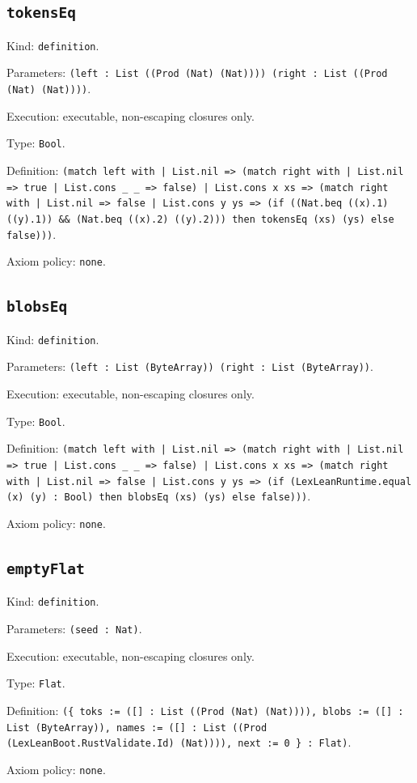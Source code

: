 \documentclass[11pt]{article}
\begin{document}
\subsection*{\texttt{tokensEq}}
\noindent Kind: \texttt{definition}.\par
\noindent Parameters: \texttt{(left : List ((Prod (Nat) (Nat)))) (right : List ((Prod (Nat) (Nat))))}.\par
\noindent Execution: executable, non-escaping closures only.\par
\noindent Type: \texttt{Bool}.\par
\noindent Definition: \texttt{(match left with | List.nil => (match right with | List.nil => true | List.cons \_ \_ => false) | List.cons x xs => (match right with | List.nil => false | List.cons y ys => (if ((Nat.beq ((x).1) ((y).1)) \&\& (Nat.beq ((x).2) ((y).2))) then tokensEq (xs) (ys) else false)))}.\par
\noindent Axiom policy: \texttt{none}.\par
\subsection*{\texttt{blobsEq}}
\noindent Kind: \texttt{definition}.\par
\noindent Parameters: \texttt{(left : List (ByteArray)) (right : List (ByteArray))}.\par
\noindent Execution: executable, non-escaping closures only.\par
\noindent Type: \texttt{Bool}.\par
\noindent Definition: \texttt{(match left with | List.nil => (match right with | List.nil => true | List.cons \_ \_ => false) | List.cons x xs => (match right with | List.nil => false | List.cons y ys => (if (LexLeanRuntime.equal (x) (y) : Bool) then blobsEq (xs) (ys) else false)))}.\par
\noindent Axiom policy: \texttt{none}.\par
\subsection*{\texttt{emptyFlat}}
\noindent Kind: \texttt{definition}.\par
\noindent Parameters: \texttt{(seed : Nat)}.\par
\noindent Execution: executable, non-escaping closures only.\par
\noindent Type: \texttt{Flat}.\par
\noindent Definition: \texttt{(\{ toks := ([] : List ((Prod (Nat) (Nat)))), blobs := ([] : List (ByteArray)), names := ([] : List ((Prod (LexLeanBoot.RustValidate.Id) (Nat)))), next := 0 \} : Flat)}.\par
\noindent Axiom policy: \texttt{none}.\par
\end{document}
